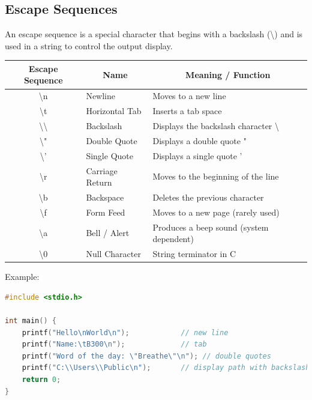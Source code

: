 \subsection{Escape Sequences}

An escape sequence is a special character that begins with a backslash (\textbackslash) and is used in a string to control the output display.
\begin{center}
    \begin{tabular}{|c|l|p{7.5cm}|}
        \hline
        \multicolumn{1}{|c|}{\textbf{Escape Sequence}} &
        \multicolumn{1}{c|}{\textbf{Name}} &
        \multicolumn{1}{c|}{\textbf{Meaning / Function}} \\ \hline
        \textbackslash n   & Newline & Moves to a new line \\ \hline
        \textbackslash t   & Horizontal Tab & Inserts a tab space \\ \hline
        \textbackslash\textbackslash & Backslash & Displays the backslash character \textbackslash \\ \hline
        \textbackslash"   & Double Quote & Displays a double quote " \\ \hline
        \textbackslash'   & Single Quote & Displays a single quote ' \\ \hline
        \textbackslash r   & Carriage Return & Moves to the beginning of the line \\ \hline
        \textbackslash b   & Backspace & Deletes the previous character \\ \hline
        \textbackslash f   & Form Feed & Moves to a new page (rarely used) \\ \hline
        \textbackslash a   & Bell / Alert & Produces a beep sound (system dependent) \\ \hline
        \textbackslash 0   & Null Character & String terminator in C \\ \hline
    \end{tabular}
\end{center}
Example:
\begin{lstlisting}[language=c]
#include <stdio.h>

int main() {
    printf("Hello\nWorld\n");            // new line
    printf("Name:\tB300\n");             // tab
    printf("Word of the day: \"Breathe\"\n"); // double quotes
    printf("C:\\Users\\Public\n");       // display path with backslash
    return 0;
}
\end{lstlisting}

